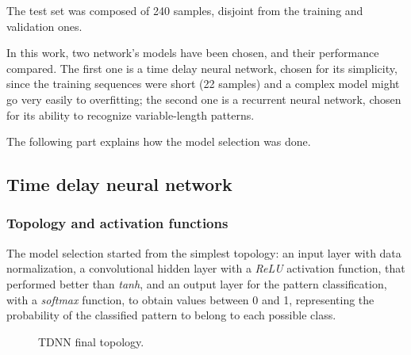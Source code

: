 The test set was composed of 240 samples, disjoint from the training and validation ones.
\bigbreak

In this work, two network's models have been chosen, and their performance compared. The first one is a time delay neural network, chosen for its simplicity, since the training sequences were short (22 samples) and a complex model might go very easily to overfitting; the second one is a recurrent neural network, chosen for its ability to recognize variable-length patterns.

The following part explains how the model selection was done.
\bigbreak

\subsection{Time delay neural network}
\subsubsection{Topology and activation functions}
The model selection started from the simplest topology: an input layer with data normalization, a convolutional hidden layer with a \textit{ReLU} activation function, that performed better than \textit{tanh}, and an output layer for the pattern classification, with a \textit{softmax} function, to obtain values between 0 and 1, representing the probability of the classified pattern to belong to each possible class.
\bigbreak

\begin{center}
	\begin{figure}[ht]
		\caption{TDNN final topology.}
	\end{figure}
\end{center}

